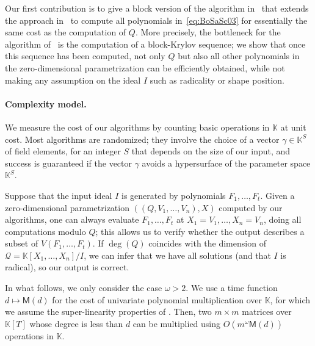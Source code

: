 \documentclass[12pt]{article}
\newcommand{\lf}{X}
\newcommand{\residueI}{\mathscr{Q}}
\newcommand{\sqfree}{Q}
\def\M {\ensuremath{\mathsf{M}}}
\def\K{\mathbb{K}}
\def\K {\ensuremath{\mathbb{K}}}
\begin{document}
Our first contribution is to give a block version of the algorithm
in~\cite{BoSaSc03} that extends the approach in~\cite{Steel15} to
compute all polynomials in~\cref{eq:BoSaSc03} for essentially the
same cost as the computation of $\sqfree$. More precisely, the bottleneck
for the algorithm of~\cite{Steel15} is the computation of a
block-Krylov sequence; we show that once this sequence has been
computed, not only $\sqfree$ but also all other polynomials in the
zero-dimensional parametrization can be efficiently obtained, while
not making any assumption on the ideal $I$ such as radicality or shape
position.

\paragraph{Complexity model.}

We measure the cost of our algorithms by counting basic operations in
$\K$ at unit cost. Most algorithms are randomized; they involve the
choice of a vector $\gamma \in \K^S$ of field elements, for an integer $S$
that depends on the size of our input, and success is guaranteed if
the vector $\gamma$ avoids a hypersurface of the parameter space
$\K^S$. 

Suppose that the input ideal $I$ is generated by polynomials
$F_1,\dots,F_t$.  Given a zero-dimensional parametrization
$((\sqfree,V_1,\dots,V_n),\lf)$ computed by our algorithms, one can
always evaluate $F_1,\dots,F_t$ at $X_1 =V_1,\dots,X_n=V_n$, doing all
computations modulo $\sqfree$; this allows us to verify whether the
output describes a subset of $V(F_1,\dots,F_t)$. If $\deg(Q)$
coincides with the dimension of $\residueI=\K[X_1,\dots,X_n]/I$, we
can infer that we have all solutions (and that $I$ is radical), so our
output is correct.

In what follows, we only consider the case $\omega>2$.  We use a time function
$d \mapsto \M(d)$ for the cost of univariate polynomial multiplication over
$\K$, for which we assume the super-linearity properties of
\cite[Section~8.4]{GaGe13}.  Then, two $m\times m$ matrices over $\K[T]$ whose
degree is less than $d$ can be multiplied using $O(m^\omega \M(d))$ operations
in $\K$.

\end{document}
